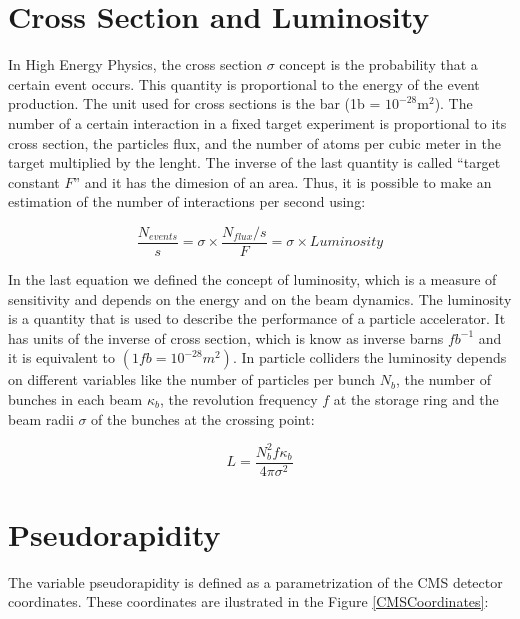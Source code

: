  \section{Cross Section and Luminosity}
 
 In High Energy Physics, the cross section $\sigma$ concept is the probability that a certain event  occurs. This quantity is proportional to the energy of the event production. The unit 
 used for cross sections is the bar (1b = $10^{-28} \text{m}^2$). The number of a certain interaction in a fixed target experiment is proportional to its cross section, the particles flux, and the
 number of atoms per cubic meter in the target multiplied by the lenght. The inverse of the last quantity is called ``target constant $F$'' and it has the dimesion of an area. Thus, it is possible
 to make an estimation of the number of interactions per second using:
 
 \begin{equation}
  \frac{N_{events}}{s} = \sigma \times \frac{N_{flux}/s}{F} = \sigma \times Luminosity
 \end{equation}

 In the last equation we defined the concept of luminosity, which is a measure of sensitivity and depends on the energy and on the beam dynamics.  The luminosity is a quantity that is used to 
 describe the performance of a particle accelerator. It has units of the inverse of cross section, which is know as inverse barns $fb^{-1}$ and it is equivalent to $(1 fb = 10^{-28} m^2)$. 
 In particle colliders the 
 luminosity depends on different variables like the number of particles per bunch $N_b$, the number of bunches in each beam $\kappa_b$, the revolution frequency $f$ at the storage ring and the beam radii 
 $ \sigma$ of the bunches at the crossing point:
 
 \begin{equation}
  L = \frac{N_b^2 f \kappa_b}{4\pi \sigma^2} 
 \end{equation}

 \section{Pseudorapidity}
 
 The variable pseudorapidity is defined as a parametrization of the CMS detector coordinates. These coordinates are ilustrated in the Figure \ref{CMSCoordinates}:
 
 
